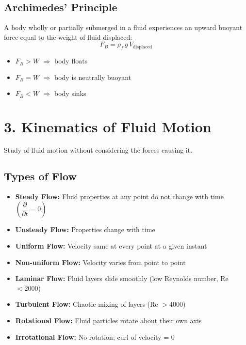 \documentclass[12pt]{article}
\begin{document}
\subsection{Archimedes' Principle}

\begin{thmbox}
A body wholly or partially submerged in a fluid experiences an upward buoyant force equal to the weight of fluid displaced:
\[
  F_B = \rho_f \, g \, V_{\text{displaced}}
\]
\end{thmbox}

\begin{itemize}[leftmargin=16pt]
  \item $F_B > W$ $\Rightarrow$ body floats
  \item $F_B = W$ $\Rightarrow$ body is neutrally buoyant
  \item $F_B < W$ $\Rightarrow$ body sinks
\end{itemize}

\section{3. Kinematics of Fluid Motion}

\begin{defbox}[Kinematics]
Study of fluid motion without considering the forces causing it.
\end{defbox}

\subsection{Types of Flow}

\begin{itemize}[leftmargin=16pt, itemsep=4pt]
  \item \textbf{Steady Flow:} Fluid properties at any point do not change with time $\left(\dfrac{\partial}{\partial t} = 0\right)$
  \item \textbf{Unsteady Flow:} Properties change with time
  \item \textbf{Uniform Flow:} Velocity same at every point at a given instant
  \item \textbf{Non-uniform Flow:} Velocity varies from point to point
  \item \textbf{Laminar Flow:} Fluid layers slide smoothly (low Reynolds number, Re $< 2000$)
  \item \textbf{Turbulent Flow:} Chaotic mixing of layers (Re $> 4000$)
  \item \textbf{Rotational Flow:} Fluid particles rotate about their own axis
  \item \textbf{Irrotational Flow:} No rotation; curl of velocity = 0
\end{itemize}
\end{document}

